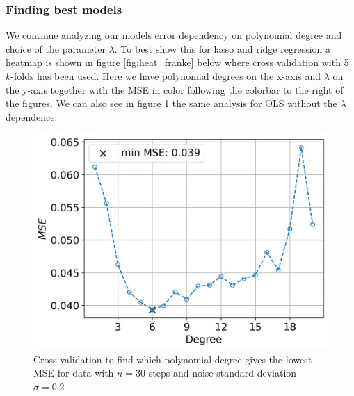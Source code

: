 \documentclass[12pt]{article}
\begin{document}
\subsubsection{Finding best models}
We continue analyzing our models error dependency on polynomial degree and choice of the parameter $\lambda$. To best show this for lasso and ridge regression a heatmap is shown in figure \ref{fig:heat_franke} below where cross validation with 5 $k$-folds has been used. Here we have polynomial degrees on the x-axis and $\lambda$ on the y-axis together with the MSE in color following the colorbar to the right of the figures. We can also see in figure \ref{fig:best_OLS} the same analysis for OLS without the $\lambda$ dependence.
\begin{figure}[H]
  \centering
  \includegraphics[width=.7\textwidth]{../figures/best_lambda_OLS_02_franke.png}
  \caption{Cross validation to find which polynomial degree gives the lowest MSE for data with $n=30$ steps and noise standard deviation $\sigma=0.2$}
  \label{fig:best_OLS}
\end{figure}
\end{document}
